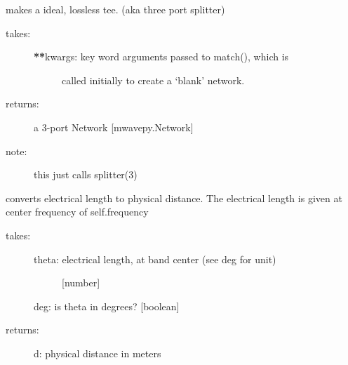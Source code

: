 \documentclass[letterpaper,10pt,english]{sphinxmanual}
\begin{document}
\begin{fulllineitems}
\begin{fulllineitems}
\label{api/mwavepy.media:mwavepy.media.media.Media.tee}
makes a ideal, lossless tee. (aka three port splitter)
\begin{description}
\item[{takes:}] \leavevmode\begin{description}
\item[{{\color{red}\bfseries{}**}kwargs: key word arguments passed to match(), which is }] \leavevmode
called initially to create a `blank' network.

\end{description}

\item[{returns:}] \leavevmode
a 3-port Network {[}mwavepy.Network{]}

\item[{note:}] \leavevmode
this just calls splitter(3)

\end{description}

\end{fulllineitems}


\begin{fulllineitems}
\label{api/mwavepy.media:mwavepy.media.media.Media.theta_2_d}
converts electrical length to physical distance. The electrical
length is given at center frequency of self.frequency
\begin{description}
\item[{takes:}] \leavevmode\begin{description}
\item[{theta: electrical length, at band center (see deg for unit)}] \leavevmode
{[}number{]}

\end{description}

deg: is theta in degrees? {[}boolean{]}

\item[{returns:}] \leavevmode
d: physical distance in meters

\end{description}

\end{fulllineitems}



\end{fulllineitems}
\end{document}
